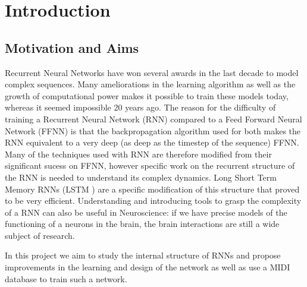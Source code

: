 
\chapter{Introduction} %

\label{Chapter 1} %




\section{Motivation and Aims}
Recurrent Neural Networks have won several awards in the last decade to model complex sequences. Many ameliorations in the learning algorithm as well as the growth of computational power makes it possible to train these models today, whereas it seemed impossible 20 years ago. The reason for the difficulty of training a Recurrent Neural Network (RNN) compared to a Feed Forward Neural Network (FFNN) is that the backpropagation algorithm used for both makes the RNN equivalent to a very deep (as deep as the timestep of the sequence) FFNN. Many of the techniques used with RNN are therefore modified from their significant sucess on FFNN, however specific work on the recurrent structure of the RNN is needed to understand its complex dynamics. Long Short Term Memory RNNs (LSTM \cite{hochreiter1997long}) are a specific modification of this structure that proved to be very efficient. Understanding and introducing tools to grasp the complexity of a RNN can also be useful in Neuroscience: if we have precise models of the functioning of a neurons in the brain, the brain interactions are still a wide subject of research.   

In this project we aim to study the internal structure of RNNs and propose improvements in the learning and design of the network as well as use a MIDI database to train such a network. 


